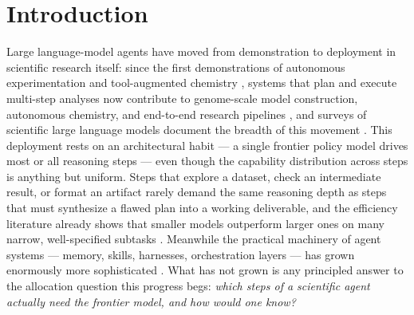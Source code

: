 \section{Introduction}
\label{sec:intro}

Large language-model agents have moved from demonstration to deployment in scientific research itself: since the first demonstrations of autonomous experimentation and tool-augmented chemistry \cite{boiko2023emergent,bran2023chemcrow}, systems that plan and execute multi-step analyses now contribute to genome-scale model construction, autonomous chemistry, and end-to-end research pipelines \cite{qian2026towards,xie2026autonomous,kong2026autoresearch}, and surveys of scientific large language models document the breadth of this movement \cite{ai4science2023impact,zhang2024comprehensive,hogg2024machine}. This deployment rests on an architectural habit --- a single frontier policy model drives most or all reasoning steps --- even though the capability distribution across steps is anything but uniform. Steps that explore a dataset, check an intermediate result, or format an artifact rarely demand the same reasoning depth as steps that must synthesize a flawed plan into a working deliverable, and the efficiency literature already shows that smaller models outperform larger ones on many narrow, well-specified subtasks \cite{cao2026taskspecific,garg2025emissions}. Meanwhile the practical machinery of agent systems --- memory, skills, harnesses, orchestration layers --- has grown enormously more sophisticated \cite{zhou2026externalization,wei2026survey}. What has not grown is any principled answer to the allocation question this progress begs: \emph{which steps of a scientific agent actually need the frontier model, and how would one know?}

